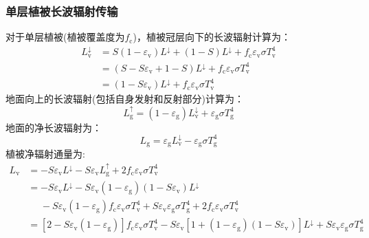 \subsubsection{单层植被长波辐射传输}

对于单层植被(植被覆盖度为$f_{\mathrm {c}}$)，植被冠层向下的长波辐射计算为：
\begin{equation}
  \begin{aligned}
    L_{\mathrm{v}} ^\downarrow &=S\left(1-\varepsilon_{\mathrm{v}}\right) L ^\downarrow+(1-S) L ^\downarrow+f_{\mathrm{c}} \varepsilon_{\mathrm{v}} \sigma T_{\mathrm{v}}^{4} \\
    &=\left(S-S \varepsilon_{\mathrm{v}}+1-S\right) L ^\downarrow+f_{\mathrm{c}} \varepsilon_{\mathrm{v}} \sigma T_{\mathrm{v}}^{4} \\
    &=\left(1-S \varepsilon_{\mathrm{v}}\right) L ^\downarrow+f_{\mathrm{c}} \varepsilon_{\mathrm{v}} \sigma T_{\mathrm{v}}^{4}
  \end{aligned}
\end{equation}
地面向上的长波辐射(包括自身发射和反射部分)计算为：
\begin{equation}
  L_{\mathrm{g}} ^\uparrow=\left(1-\varepsilon_{\mathrm{g}}\right) L_{\mathrm{v}} ^\downarrow+\varepsilon_{\mathrm{g}} \sigma T_{\mathrm{g}}^{4}
\end{equation}
地面的净长波辐射为：
\begin{equation}
  {L_{\mathrm{g}}}=\varepsilon_{\mathrm{g}} L_{\mathrm{v}} ^\downarrow -\varepsilon_{\mathrm{g}} \sigma T_{\mathrm{g}}^{4}
\end{equation}
植被净辐射通量为:
\begin{equation}
  \begin{aligned} {L_{\mathrm{v}}} &=-S \varepsilon_{\mathrm{v}} L ^\downarrow-S \varepsilon_{\mathrm{v}} L_{\mathrm{g}}
    ^\uparrow+2 f_{\mathrm{c}} \varepsilon_{\mathrm{v}} \sigma T_{\mathrm{v}}^{4} \\
    &=-S \varepsilon_{\mathrm{v}} L ^\downarrow-S
    \varepsilon_{\mathrm{v}}\left(1-\varepsilon_{\mathrm{g}}\right)\left(1-S \varepsilon_{\mathrm{v}}\right) L^\downarrow \\
    &\mathrel{\phantom{=}} -S \varepsilon_{\mathrm{v}}\left(1-\varepsilon_{\mathrm{g}}\right) f_{\mathrm{c}} \varepsilon_{\mathrm{v}} \sigma T_{\mathrm{v}}^{4}+S
    \varepsilon_{\mathrm{v}} \varepsilon_{\mathrm{g}} \sigma T_{\mathrm{g}}^{4}+2 f_{\mathrm{c}} \varepsilon_{\mathrm{v}} \sigma T_{\mathrm{v}}^{4} \\
    &=\left[2-S \varepsilon_{\mathrm{v}}\left(1-\varepsilon_{\mathrm{g}}\right)\right] f_{\mathrm{c}} \varepsilon_{\mathrm{v}}
    \sigma T_{\mathrm{v}}^{4}-S \varepsilon_{\mathrm{v}}\left[1+\left(1-\varepsilon_{\mathrm{g}}\right)\left(1-S \varepsilon_{\mathrm{v}}\right)\right]
  L ^\downarrow+S \varepsilon_{\mathrm{v}} \varepsilon_{\mathrm{g}} \sigma T_{\mathrm{g}}^{4} \end{aligned}
\end{equation}
